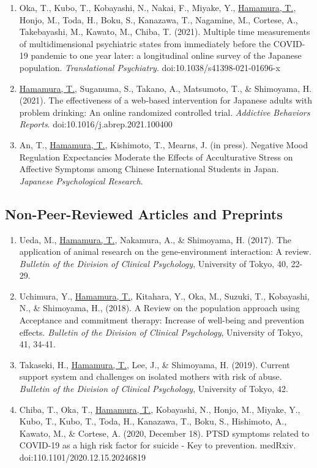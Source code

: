 \documentclass{article}
\begin{document}
\begin{enumerate}
	\item Oka, T., Kubo, T., Kobayashi, N., Nakai, F., Miyake, Y., \underline{Hamamura, T.}, Honjo, M., Toda, H., Boku, S., Kanazawa, T., Nagamine, M.,  Cortese, A., Takebayashi, M., Kawato, M., Chiba, T. (2021). Multiple time measurements of multidimensional psychiatric states from immediately before the COVID-19 pandemic to one year later: a longitudinal online survey of the Japanese population. \textit{Translational Psychiatry}. doi:10.1038/s41398-021-01696-x
	\item \underline{Hamamura, T.}, Suganuma, S., Takano, A., Matsumoto, T., \& Shimoyama, H. (2021). The effectiveness of a web-based intervention for Japanese adults with problem drinking: An online randomized controlled trial. \textit{Addictive Behaviors Reports}. doi:10.1016/j.abrep.2021.100400	
	\item An, T., \underline{Hamamura, T.}, Kishimoto, T., Mearns, J. (in press). Negative Mood Regulation Expectancies Moderate the Effects of Acculturative Stress on Affective Symptoms among Chinese International Students in Japan. \textit{Japanese Psychological Research}.
\end{enumerate}

\subsection{Non-Peer-Reviewed Articles and Preprints}
\begin{enumerate}
	\item Ueda, M., \underline{Hamamura, T.}, Nakamura, A., \& Shimoyama, H. (2017). The application of animal research on the gene-environment interaction: A review. \textit{Bulletin of the Division of Clinical Psychology}, University of Tokyo, 40, 22-29.
	\item Uchimura, Y., \underline{Hamamura, T.}, Kitahara, Y., Oka, M., Suzuki, T., Kobayashi, N., \& Shimoyama, H., (2018). A Review on the population approach using Acceptance and commitment therapy: Increase of well-being and prevention effects. \textit{Bulletin of the Division of Clinical Psychology}, University of Tokyo, 41, 34-41.
	\item Takaseki, H., \underline{Hamamura, T.}, Lee, J., \& Shimoyama, H. (2019). Current support system and challenges on isolated mothers with risk of abuse. \textit{Bulletin of the Division of Clinical Psychology}, University of Tokyo, 42.
	\item Chiba, T., Oka, T., \underline{Hamamura, T.}, Kobayashi, N., Honjo, M., Miyake, Y., Kubo, T., Kubo, T., Toda, H., Kanazawa, T., Boku, S., Hishimoto, A., Kawato, M., \& Cortese, A. (2020, December 18). PTSD symptoms related to COVID-19 as a high risk factor for suicide - Key to prevention. medRxiv. doi:110.1101/2020.12.15.20246819
\end{enumerate}
	 
\end{document}

